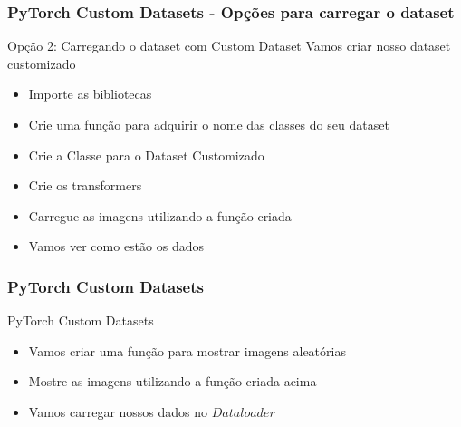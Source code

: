 \documentclass{beamer}
\begin{document}
\begin{frame}
	\frametitle{PyTorch Custom Datasets - Opções para carregar o dataset}
	\begin{block}{Opção 2: Carregando o dataset com Custom Dataset}
		Vamos criar nosso dataset customizado
		\begin{itemize}
			\item Importe as bibliotecas
			\item Crie uma função para adquirir o nome das classes do seu dataset
			\item Crie a Classe para o Dataset Customizado
			\item Crie os transformers
			\item Carregue as imagens utilizando a função criada
			\item Vamos ver como estão os dados
		\end{itemize}
	\end{block}
\end{frame}
\begin{frame}
	\frametitle{PyTorch Custom Datasets}
	\begin{block}{PyTorch Custom Datasets}
		\begin{itemize}
			\item Vamos criar uma função para mostrar imagens aleatórias
			\item Mostre as imagens utilizando a função criada acima
			\item Vamos carregar nossos dados no $Dataloader$
		\end{itemize}
	\end{block}
\end{frame}
\end{document}

